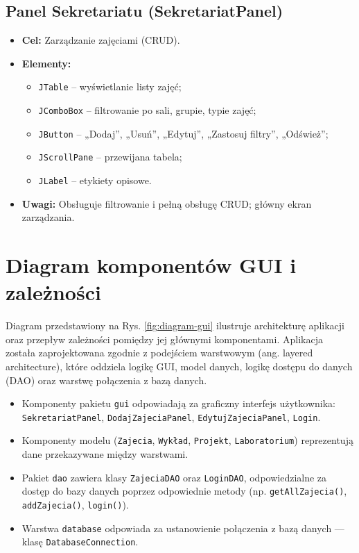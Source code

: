 \subsection {Panel Sekretariatu (SekretariatPanel)}

\begin{itemize}
    \item \textbf{Cel:} Zarządzanie zajęciami (CRUD).
    \item \textbf{Elementy:}
    \begin{itemize}
        \item \texttt{JTable} – wyświetlanie listy zajęć;
        \item \texttt{JComboBox} – filtrowanie po sali, grupie, typie zajęć;
        \item \texttt{JButton} – „Dodaj”, „Usuń”, „Edytuj”, „Zastosuj filtry”, „Odśwież”;
        \item \texttt{JScrollPane} – przewijana tabela;
        \item \texttt{JLabel} – etykiety opisowe.
    \end{itemize}
    \item \textbf{Uwagi:} Obsługuje filtrowanie i pełną obsługę CRUD; główny ekran zarządzania.
\end{itemize}

\clearpage
\section{Diagram komponentów GUI i zależności}

Diagram przedstawiony na Rys. \ref{fig:diagram-gui} ilustruje architekturę aplikacji oraz przepływ zależności pomiędzy jej głównymi komponentami. Aplikacja została zaprojektowana zgodnie z podejściem warstwowym (ang. layered architecture), które oddziela logikę GUI, model danych, logikę dostępu do danych (DAO) oraz warstwę połączenia z bazą danych.

\begin{itemize}
    \item Komponenty pakietu \texttt{gui} odpowiadają za graficzny interfejs użytkownika: \texttt{SekretariatPanel}, \texttt{DodajZajeciaPanel}, \texttt{EdytujZajeciaPanel}, \texttt{Login}.
    \item Komponenty modelu (\texttt{Zajecia}, \texttt{Wykład}, \texttt{Projekt}, \texttt{Laboratorium}) reprezentują dane przekazywane między warstwami.
    \item Pakiet \texttt{dao} zawiera klasy \texttt{ZajeciaDAO} oraz \texttt{LoginDAO}, odpowiedzialne za dostęp do bazy danych poprzez odpowiednie metody (np. \texttt{getAllZajecia()}, \texttt{addZajecia()}, \texttt{login()}).
    \item Warstwa \texttt{database} odpowiada za ustanowienie połączenia z bazą danych — klasę \texttt{DatabaseConnection}.
\end{itemize}

